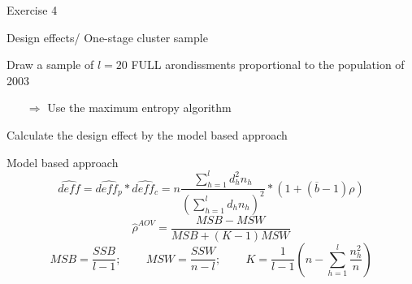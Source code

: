 \documentclass[11pt,german,hideothersubsections]{beamer}\usepackage[]{graphicx}\usepackage[]{color}
\begin{document}
\begin{frame}[fragile]{Exercise 4}
\footnotesize{
\begin{exampleblock}{Design effects/ One-stage cluster sample}
\begin{enumerate}\footnotesize{
\item Draw a sample of $l=20$ FULL arondissments proportional to the population of 2003
\begin{itemize}
\item[$\Rightarrow$] Use the maximum entropy algorithm
\end{itemize}
\item Calculate the design effect by the model based approach
\begin{block}{Model based approach}
\begin{equation*}
\hat{deff}=\hat{deff_p} * \hat{deff_c} = n\frac{\sum_{h=1}^ld_h^2 n_h}{(\sum_{h=1}^ld_h n_h)^2}*(1+(\overline{b}-1)\rho)
\end{equation*}
\begin{equation*}
\hat{\rho}^{AOV}=\frac{MSB-MSW}{MSB+(K-1)MSW}
\end{equation*}
\begin{equation*}
MSB=\frac{SSB}{l-1}\text{;~~~~~~~}MSW=\frac{SSW}{n-l}\text{;~~~~~~~}K=\frac{1}{l-1}(n-\sum_{h=1}^l\frac{n_h^2}{n})
\end{equation*}
\end{block}
}
\end{enumerate}
\end{exampleblock}
}
\end{frame}
\end{document}
